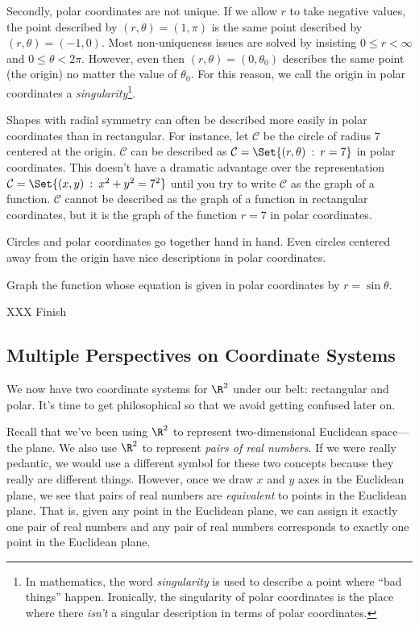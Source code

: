 Secondly, polar coordinates are not unique.  If we allow $r$ to take negative
values, the point described by $(r,\theta)=(1,\pi)$ is the same point described by $(r,\theta)=(-1,0)$.  
Most non-uniqueness issues are solved by insisting
$0\leq r <\infty$ and $0\leq\theta < 2\pi$.  However, even then 
$(r,\theta)=(0,\theta_0)$ describes the same point (the origin) no matter
the value of $\theta_0$.  For this reason,
we call the origin in polar coordinates a \emph{singularity}\footnote{ In mathematics, the word
\emph{singularity} is used to describe a point where ``bad things'' happen.  Ironically, the
singularity of polar coordinates is the place where there \emph{isn't} a singular description
in terms of polar coordinates.}.

\bigskip
Shapes with radial symmetry can often be described more easily in polar coordinates than
in rectangular.  For instance, let $\mathcal C$ be the circle of radius $7$ centered at the origin.
$\mathcal C$ can be described as
$\mathcal C=\Set{(r,\theta)\given r=7}$ in polar coordinates.  This doesn't have a dramatic
advantage over the representation $\mathcal C=\Set{(x,y)\given x^2+y^2=7^2}$ until you try to write
$\mathcal C$ as the graph of a function.  $\mathcal C$ cannot be described as the graph of a function
in rectangular coordinates, but it is the graph of the function $r=7$ in polar coordinates.

Circles and polar coordinates go together hand in hand.  Even circles centered away from the origin
have nice descriptions in polar coordinates.
\begin{example}
	Graph the function whose equation is given in polar coordinates by $r=\sin\theta$.

	XXX Finish
\end{example}

\subsection{Multiple Perspectives on Coordinate Systems}

We now have two coordinate systems for $\R^2$ under our belt: rectangular and polar.  
It's time to get philosophical so that we avoid getting confused later on.

Recall that we've been using $\R^2$ to represent two-dimensional Euclidean space---the plane.
We also use $\R^2$ to represent \emph{pairs of real numbers}.  If we were really pedantic,
we would use a different symbol for these two concepts because they really are different things.
However, once we draw $x$ and $y$ axes in the Euclidean plane, we see that pairs of real numbers
are \emph{equivalent} to points in the Euclidean plane.  That is, given any point in the Euclidean
plane, we can assign it exactly one pair of real numbers and any pair of real numbers corresponds
to exactly one point in the Euclidean plane.


